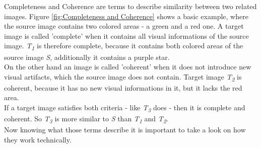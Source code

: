 Completeness and Coherence are terms to describe similarity between two related images. Figure \ref{fig:Completeness and Coherence} shows a basic example, where the source image contains two colored areas - a green and a red one. A target image is called 'complete' when it contains all visual informations of the source image. \textit{T\textsubscript{1}} is therefore complete, because it contains both colored areas of the source image \textit{S}, additionally it contains a purple star.\\
On the other hand an image is called 'coherent' when it does not introduce new visual artifacts, which the source image does not contain. Target image \textit{T\textsubscript{2}} is coherent, because it has no new visual informations in it, but it lacks the red area.\\
If a target image satisfies both criteria - like \textit{T\textsubscript{3}} does - then it is complete and coherent. So \textit{T\textsubscript{3}} is more similar to \textit{S} than \textit{T\textsubscript{1}} and \textit{T\textsubscript{2}}.\\
Now knowing what those terms describe it is important to take a look on how they work technically.

